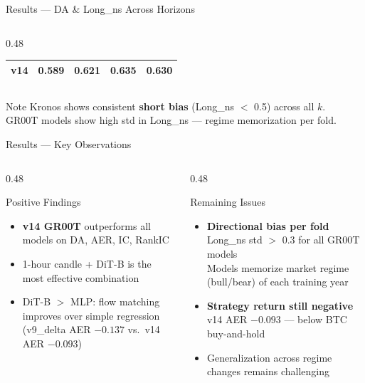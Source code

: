 \documentclass[aspectratio=169,11pt]{beamer}
\begin{document}
\begin{frame}{Results --- DA \& Long\_ns Across Horizons}
\begin{columns}
\begin{column}{0.48\textwidth}
\begin{table}
\begin{tabular}{lcccc}
          \textbf{v14}  & 0.589 & 0.621 & 0.635 & 0.630 \\
          \bottomrule
        \end{tabular}
      \end{table}
    \end{column}
  \end{columns}
  \vspace{0.4em}
  \begin{block}{Note}
    Kronos shows consistent \textbf{short bias} (Long\_ns $<$ 0.5) across all $k$. \\[0.3em]
    GR00T models show high std in Long\_ns --- regime memorization per fold.
  \end{block}
\end{frame}

\begin{frame}{Results --- Key Observations}
  \begin{columns}
    \begin{column}{0.48\textwidth}
      \begin{exampleblock}{Positive Findings}
        \begin{itemize}
          \item \textbf{v14 GR00T} outperforms all models on DA, AER, IC, RankIC
          \item 1-hour candle + DiT-B is the most effective combination
          \item DiT-B $>$ MLP: flow matching improves over simple regression\\
            (v9\_delta AER $-0.137$ vs.\ v14 AER $-0.093$)
        \end{itemize}
      \end{exampleblock}
    \end{column}
    \begin{column}{0.48\textwidth}
      \begin{alertblock}{Remaining Issues}
        \begin{itemize}
          \item \textbf{Directional bias per fold}\\
            Long\_ns std $>$ 0.3 for all GR00T models\\
            Models memorize market regime (bull/bear) of each training year
          \item \textbf{Strategy return still negative}\\
            v14 AER $-0.093$ --- below BTC buy-and-hold
          \item Generalization across regime changes remains challenging
        \end{itemize}
      \end{alertblock}
    \end{column}
  \end{columns}
\end{frame}
\end{document}
